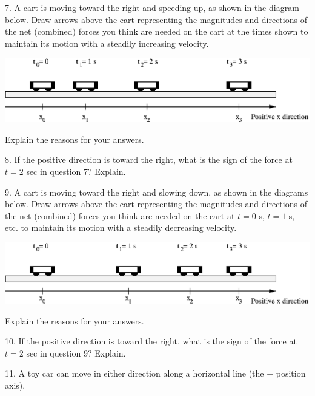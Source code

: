 7. A cart is moving toward the right and speeding up, as shown in the diagram
below. Draw arrows above the cart representing the magnitudes and directions
of the net (combined) forces you think are needed on the cart at the times shown
to maintain its motion with a steadily increasing velocity.

\vspace{0.3cm}
{\par\centering \includegraphics{force2_fig8.eps} \par}
\vspace{0.3cm}

Explain the reasons for your answers.
\vspace{20mm}

8. If the positive direction is toward the right, what is the sign of the force
at $t = 2$ sec in question 7? Explain.
\vspace{20mm}

9. A cart is moving toward the right and slowing down, as shown in the diagrams
below. Draw arrows above the cart representing the magnitudes and directions
of the net (combined) forces you think are needed on the cart at $t = 0$ s, 
$t
= 1$ s, etc. to maintain its motion with a steadily decreasing velocity.

\vspace{0.3cm}
{\par\centering \includegraphics{force2_fig9.eps} \par}
\vspace{0.3cm}

Explain the reasons for your answers.
\vspace{30mm}

10. If the positive direction is toward the right, what is the sign of the force
at $t = 2$ sec in question 9? Explain.
\vspace{30mm}

11. A toy car can move in either direction along a horizontal line (the + position
axis).

